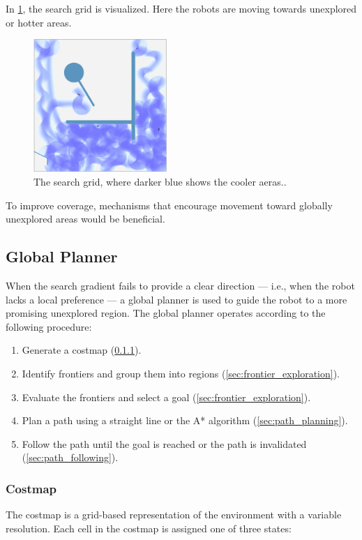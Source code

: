 In \cref{fig:gradient-forward-bias}, the search grid is visualized. Here the robots are moving towards unexplored or hotter areas.
\begin{figure}[H]
  \centering
  \includegraphics[width=0.45\textwidth]{./figures/screenshots/with-forward.jpeg}
  \caption{The search grid, where darker blue shows the cooler aeras..}
  \label{fig:gradient-forward-bias}
\end{figure}

To improve coverage, mechanisms that encourage movement toward globally unexplored areas would be beneficial.

\subsection{Global Planner}
When the search gradient fails to provide a clear direction --- i.e., when the robot lacks a local preference --- a global planner is used to guide the robot to a more promising unexplored region. The global planner operates according to the following procedure:

\begin{enumerate}
  \item Generate a costmap (\cref{sec:costmap}).
  \item Identify frontiers and group them into regions \cite{frontier-exploration} (\cref{sec:frontier_exploration}).
  \item Evaluate the frontiers and select a goal (\cref{sec:frontier_exploration}).
  \item Plan a path using a straight line or the A* algorithm \cite{a-star} (\cref{sec:path_planning}).
  \item Follow the path until the goal is reached or the path is invalidated (\cref{sec:path_following}).
\end{enumerate}
 
\subsubsection{Costmap}
\label{sec:costmap}
The costmap is a grid-based representation of the environment with a variable resolution. Each cell in the costmap is assigned one of three states:

